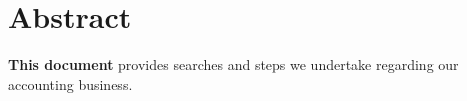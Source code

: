 \section*{Abstract}

\textbf{This document} provides searches and steps we undertake regarding our
accounting business. 
\newline
